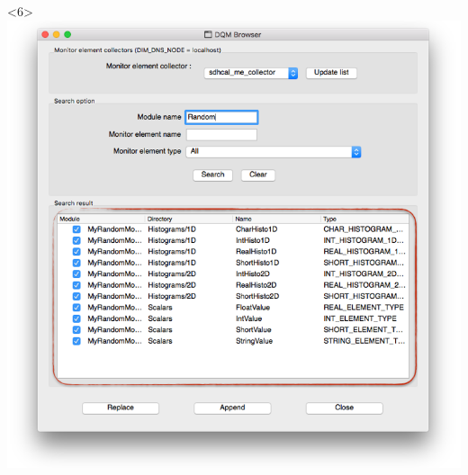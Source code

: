\documentclass[8pt]{beamer}
\begin{document}
\begin{frame}
\begin{overlayarea}{\textwidth}{\textheight}
\begin{columns}
\begin{center}
         \begin{onlyenv}<6>\includegraphics[width=1.5\textwidth]{figs/Browser/Browser_SearchResult}\end{onlyenv}
               \end{center}

           \end{columns}
               \end{overlayarea}
    
  \end{frame}
  
\end{document}
